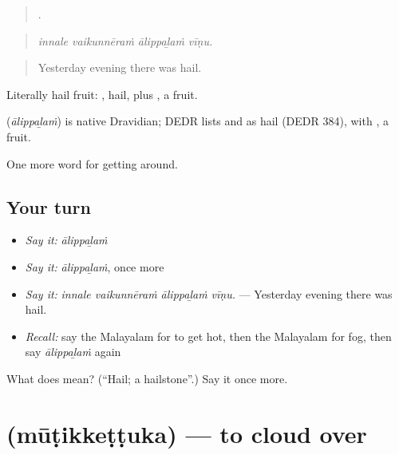 \begin{quote}
   .
\end{quote}

\begin{quote}
\emph{innale vaikunnēraṁ ālippaḻaṁ vīṇu.}
\end{quote}

\begin{quote}
Yesterday evening there was hail.
\end{quote}

Literally hail fruit: , hail, plus , a fruit.

\begin{cousinweb}
\textbf{} (\emph{ālippaḻaṁ}) is native Dravidian; DEDR lists  and  as hail (DEDR 384), with , a fruit.
\end{cousinweb}

\begin{grammarlens}[title={What you've built}]
One more word for getting around.
\end{grammarlens}

\subsection*{Your turn}
\begin{itemize}
\raggedright
  \item \emph{Say it:} \emph{ālippaḻaṁ}
  \item \emph{Say it:} \emph{ālippaḻaṁ}, once more
  \item \emph{Say it:} \emph{innale vaikunnēraṁ ālippaḻaṁ vīṇu.} — Yesterday evening there was hail.
  \item \emph{Recall:} say the Malayalam for to get hot, then the Malayalam for fog, then say \emph{ālippaḻaṁ} again
\end{itemize}

\begin{tcolorbox}[breakable,colback=teal!4,colframe=teal!35!black,title={Before you move on}]
What does  mean? (\textquotedblleft{}Hail; a hailstone\textquotedblright{}.) Say it once more.
\end{tcolorbox}
\section[\texorpdfstring{\ml{മൂടിക്കെട്ടുക} (mūṭikkeṭṭuka)}{മൂടിക്കെട്ടുക (mūṭikkeṭṭuka)}]{ (mūṭikkeṭṭuka) — to cloud over}

